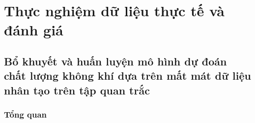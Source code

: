 \chapter{Thực nghiệm dữ liệu thực tế và đánh giá}
\section{Bổ khuyết và huấn luyện mô hình dự đoán chất lượng không khí dựa trên mất mát dữ liệu nhân tạo trên tập quan trắc}\label{ex-1}
\subsection{Tổng quan}
    
        
            
                
            
        
            
                
